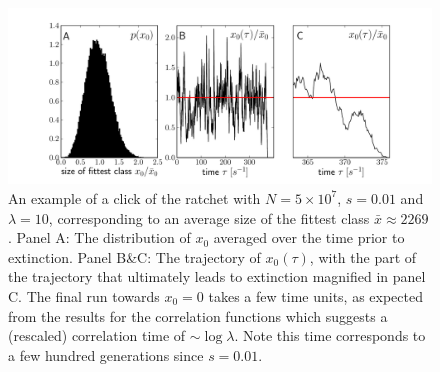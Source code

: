 \documentclass[rmp,preprint]{revtex4}
\newcommand{\x}{x}
\newcommand{\xs}{\bar{\x}}
\begin{document}
\begin{figure}[tp]
\begin{center}
  \includegraphics[width=0.99\columnwidth]{Figures/click_illustration}
  \caption[labelInTOC]{An example of a click of the ratchet with $N=5\times 10^{7}$, $s=0.01$ and $\lambda=10$, corresponding to an average size of the fittest class $\xs \approx 2269$. Panel A: The distribution of $\x_0$ averaged over the time prior to extinction. Panel B\&C: The trajectory of $\x_0(\tau)$, with the part of the trajectory that ultimately leads to extinction magnified in panel C. The final run towards $\x_0=0$ takes a few time units, as expected from the results for the correlation functions which suggests a (rescaled) correlation time of $\sim \log \lambda$. Note this time corresponds to a few hundred generations since $s=0.01$.}
  \label{fig:click_illustration}
\end{center}
\end{figure}
\end{document}
